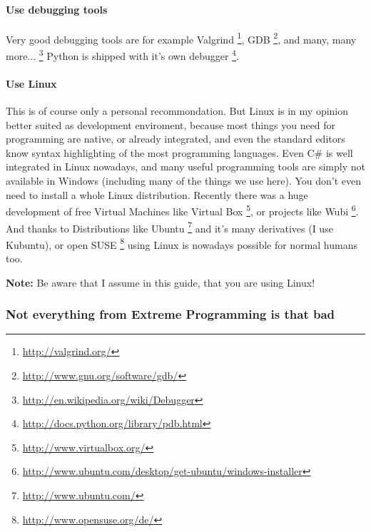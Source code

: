 \documentclass[letterpaper,10pt,english]{manual}
\begin{document}
\paragraph{Use debugging tools}

Very good debugging tools are for example Valgrind \footnote{
\href{http://valgrind.org/}{http://valgrind.org/}
}, GDB \footnote{
\href{http://www.gnu.org/software/gdb/}{http://www.gnu.org/software/gdb/}
},
and many, many more... \footnote{
\href{http://en.wikipedia.org/wiki/Debugger}{http://en.wikipedia.org/wiki/Debugger}
}
Python is shipped with it's own debugger \footnote{
\href{http://docs.python.org/library/pdb.html}{http://docs.python.org/library/pdb.html}
}.


\paragraph{Use Linux}

This is of course only a personal recommondation. But Linux is in my opinion better
suited as development enviroment, because most things you need for programming are native, or
already integrated, and even the standard editors know syntax highlighting of the most programming
languages. Even C\# is well integrated in Linux nowadays, and many useful programming tools are simply not
available in Windows (including many of the things we use here).
You don't even need to install a whole Linux distribution. Recently there was a huge development of free
Virtual Machines like Virtual Box \footnote{
\href{http://www.virtualbox.org/}{http://www.virtualbox.org/}
}, or projects like Wubi \footnote{
\href{http://www.ubuntu.com/desktop/get-ubuntu/windows-installer}{http://www.ubuntu.com/desktop/get-ubuntu/windows-installer}
}. And thanks to Distributions like
Ubuntu \footnote{
\href{http://www.ubuntu.com/}{http://www.ubuntu.com/}
}  and it's many derivatives (I use Kubuntu), or open SUSE \footnote{
\href{http://www.opensuse.org/de/}{http://www.opensuse.org/de/}
} using Linux is nowadays possible for
normal humans too.

\textbf{Note:} Be aware that I assume in this guide,
that you are using Linux!


\subsubsection{Not everything from Extreme Programming is that bad}
\end{document}
